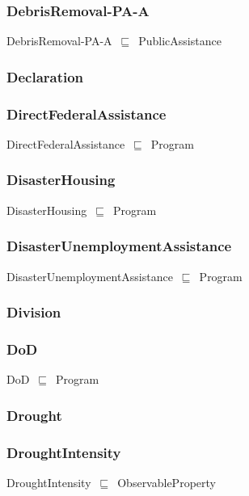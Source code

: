 \documentclass{article}
\begin{document}
\subsubsection*{DebrisRemoval-PA-A}

DebrisRemoval-PA-A~\ensuremath{\sqsubseteq}~PublicAssistance~

\subsubsection*{Declaration}

\subsubsection*{DirectFederalAssistance}

DirectFederalAssistance~\ensuremath{\sqsubseteq}~Program~

\subsubsection*{DisasterHousing}

DisasterHousing~\ensuremath{\sqsubseteq}~Program~

\subsubsection*{DisasterUnemploymentAssistance}

DisasterUnemploymentAssistance~\ensuremath{\sqsubseteq}~Program~

\subsubsection*{Division}

\subsubsection*{DoD}

DoD~\ensuremath{\sqsubseteq}~Program~

\subsubsection*{Drought}

\subsubsection*{DroughtIntensity}

DroughtIntensity~\ensuremath{\sqsubseteq}~ObservableProperty~
\end{document}
